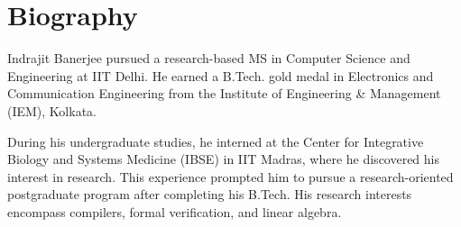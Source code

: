 \chapter*{Biography}
Indrajit Banerjee pursued a research-based MS in Computer Science and Engineering at IIT Delhi.
He earned a B.Tech. gold medal in Electronics and Communication Engineering from the Institute of Engineering \& Management (IEM), Kolkata.

During his undergraduate studies, he interned at the Center for Integrative Biology and Systems Medicine (IBSE) in IIT Madras,
where he discovered his interest in research.
This experience prompted him to pursue a research-oriented postgraduate program after completing his B.Tech.
His research interests encompass compilers, formal verification, and linear algebra.
